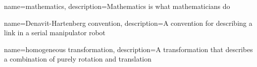 \makeglossaries
 
 
{
    name=mathematics,
    description={Mathematics is what mathematicians do}
}

{
    name={Denavit-Hartenberg convention},
    description={A convention for describing a link in a serial manipulator robot}
}

{
    name={homogeneous transformation},
    description={A transformation that describes a combination of purely rotation and translation}
}